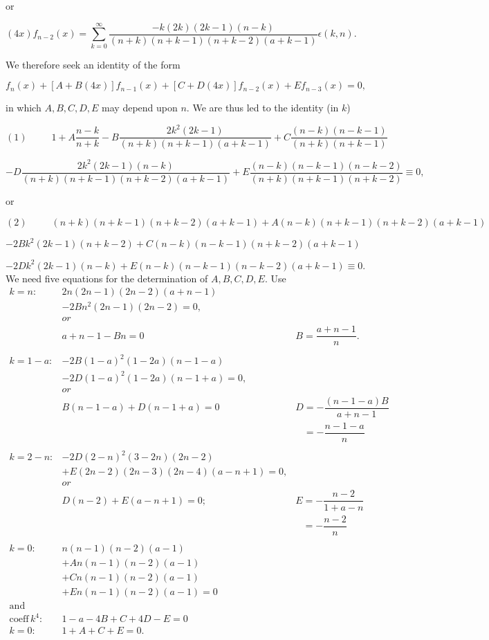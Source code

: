 \begin{solution}
or

$$(4x)f_{n-2}(x) = \displaystyle\sum_{k=0}^{\infty} \dfrac{-k(2k)(2k-1)(n-k)}{(n+k)(n+k-1)(n+k-2)(a+k-1)} \epsilon(k,n).$$

We therefore seek an identity of the form

$$f_n(x) + [A+B(4x)]f_{n-1}(x) + [C+D(4x)]f_{n-2}(x)+E f_{n-3}(x) =0,$$

in which $A,B,C,D,E$ may depend upon $n$. We are thus led to the identity (in $k$)

$$(1) \hspace{30pt} 1 + A \dfrac{n-k}{n+k} - B \dfrac{2k^2(2k-1)}{(n+k)(n+k-1)(a+k-1)} + C \dfrac{(n-k)(n-k-1)}{(n+k)(n+k-1)}$$

$$-D \dfrac{2k^2(2k-1)(n-k)}{(n+k)(n+k-1)(n+k-2)(a+k-1)} + E \dfrac{(n-k)(n-k-1)(n-k-2)}{(n+k)(n+k-1)(n+k-2)} \equiv 0,$$

or

$$(2) \hspace{30pt} (n+k)(n+k-1)(n+k-2)(a+k-1) + A( n-k)(n+k-1)(n+k-2)(a+k-1)$$

$$-2Bk^2(2k-1)(n+k-2) + C(n-k)(n-k-1)(n+k-2)(a+k-1)$$

$$-2Dk^2(2k-1)(n-k) + E(n-k)(n-k-1)(n-k-2)(a+k-1) \equiv 0.$$
We need five equations for the determination of $A,B,C,D,E$. Use
$$\begin{array}{lll}
k=n: & 2n(2n-1)(2n-2)(a+n-1) \\
& -2Bn^2(2n-1)(2n-2)=0, & \\
& or \\
& a+n-1 -Bn = 0 & B = \dfrac{a+n-1}{n}. \\
& \\
k=1-a: & -2B(1-a)^2(1-2a)(n-1-a) \\
& -2D(1-a)^2(1-2a)(n-1+a)=0, \\
& or \\
& B(n-1-a)+D(n-1+a)=0 & D= - \dfrac{(n-1-a)B}{a+n-1} \\
& & \phantom{D}=-\dfrac{n-1-a}{n} \\
& \\
k=2-n: & -2D(2-n)^2(3-2n)(2n-2) \\
& + E(2n-2)(2n-3)(2n-4)(a-n+1) =0, \\
& or \\
& D(n-2)+E(a-n+1)=0; & E = -\dfrac{n-2}{1+a-n} \\
& & \phantom{E}=-\dfrac{n-2}{n} \\
& \\
k=0: & n(n-1)(n-2)(a-1) \\
& +An(n-1)(n-2)(a-1) \\
& +Cn(n-1)(n-2)(a-1) \\
& +En(n-1)(n-2)(a-1)=0 \\
\mathrm{and} \\
\mathrm{coeff \hspace{2pt}} k^4: & 1-a-4B+C+4D-E=0 \\
k=0: & 1+A+C+E=0.
\end{array}$$


\end{solution}
